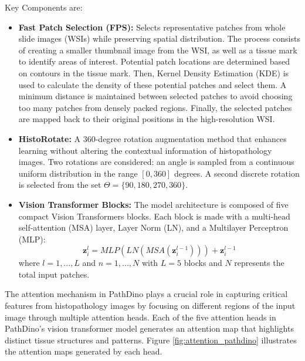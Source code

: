 \documentclass[peerreview]{IEEEtran}
\begin{document}
Key Components are:
\begin{itemize}
    \item \textbf{Fast Patch Selection (FPS):} Selects representative patches from whole slide images (WSIs) while preserving spatial distribution. The process consists of creating a smaller thumbnail image from the WSI, as well as a tissue mark to identify areas of interest. Potential patch locations are determined based on contours in the tissue mark. Then, Kernel Density Estimation (KDE) is used to calculate the density of these potential patches and select them. A minimum distance is maintained between selected patches to avoid choosing too many patches from densely packed regions. Finally, the selected patches are mapped back to their original positions in the high-resolution WSI.
    \item \textbf{HistoRotate:} A 360-degree rotation augmentation method that enhances learning without altering the contextual information of histopathology images. Two rotations are considered: an angle is sampled from a continuous uniform distribution in the range $[0,360]$ degrees. A second discrete rotation is selected from the set $\Theta=\{90,180,270,360\}$.
    \item \textbf{Vision Transformer Blocks:} The model architecture is composed of five compact Vision Transformers blocks. Each block is made with a multi-head self-attention (MSA) layer, Layer Norm (LN), and a Multilayer Perceptron (MLP):
    \begin{equation}
        \textbf{z}^l_i = MLP(LN(MSA(\textbf{z}^{l-1}_i))) + \textbf{z}^{l-1}_i
    \end{equation}
    where  $l=1,...,L$ and $n=1,...,N$ with $L=5$ blocks and $N$ represents the total input patches.
\end{itemize}

The attention mechanism in PathDino plays a crucial role in capturing critical features from histopathology images by focusing on different regions of the input image through multiple attention heads. Each of the five attention heads in PathDino's vision transformer model generates an attention map that highlights distinct tissue structures and patterns. Figure \ref{fig:attention_pathdino} illustrates the attention maps generated by each head.
\end{document}
